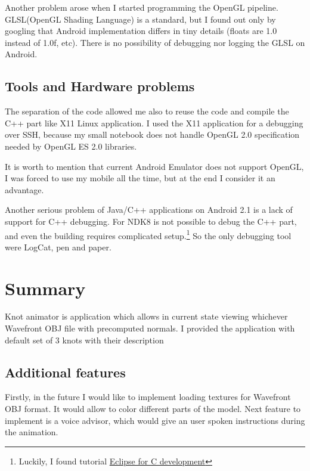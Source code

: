 Another problem arose when I started programming the OpenGL pipeline.
GLSL(OpenGL Shading Language) is a standard, 
but I found out  only by googling
that Android implementation differs in tiny details (floats are 1.0 instead of 1.0f, etc).
There is no possibility of debugging nor logging the GLSL on Android.

\subsection*{Tools and Hardware problems} %
The separation of the code allowed me also to reuse the code and compile 
the C++ part like X11 Linux application. I used the X11 application for a debugging
over SSH, because my small notebook does not handle OpenGL 2.0 specification
needed by OpenGL ES 2.0 libraries.

It is worth to mention that current Android Emulator does not support OpenGL, 
I was forced to use my mobile all the time, 
but at the end I consider it an advantage.

Another serious problem of Java/C++ applications on Android 2.1 is a lack of support for C++ debugging.
For NDK8 is not possible to debug the C++ part, 
and even the building requires complicated setup.\footnote{Luckily, I found tutorial \href{http://mhandroid.wordpress.com/2011/01/23/using-eclipse-for-android-cc-development/}{Eclipse for C development} }
So the only debugging tool were LogCat, pen and paper.

\section{Summary} %
\label{sec:Summary}
Knot animator is application which allows in current state viewing whichever Wavefront OBJ file
with precomputed normals. I provided the application with default set of 3 knots with their description

\subsection*{Additional features} %
\label{sec:Additional freatures}
Firstly, in the future I would like to implement loading textures for Wavefront OBJ format.
It would allow to color different parts of the model.
Next feature to implement is a voice advisor, which would give an user spoken instructions during the animation.

